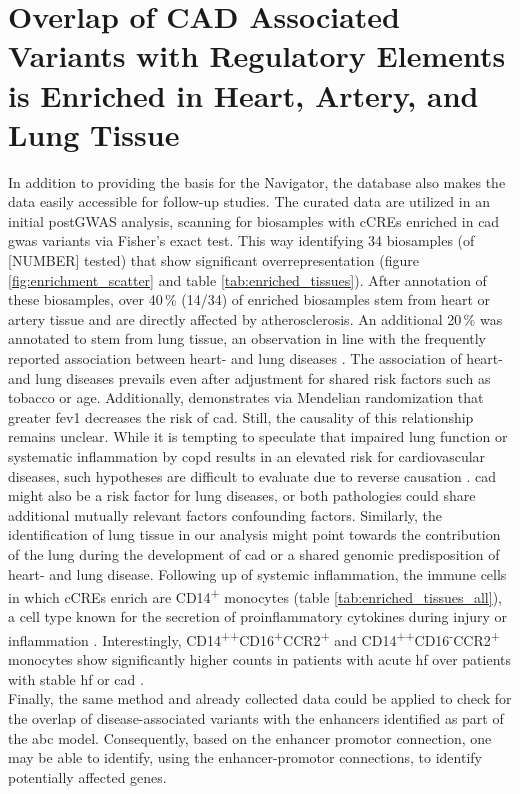 \section{Overlap of CAD Associated Variants with Regulatory Elements is Enriched in Heart, Artery, and Lung Tissue}
In addition to providing the basis for the  Navigator, the database also makes the data easily accessible for follow-up studies. The curated data are utilized in an initial postGWAS analysis, scanning for biosamples with \acp{cCRE} enriched in \ac{cad} \ac{gwas} variants via Fisher's exact test. This way identifying 34 biosamples (of [NUMBER] tested) that show significant overrepresentation (figure \ref{fig:enrichment_scatter} and table \ref{tab:enriched_tissues}). After annotation of these biosamples, over 40\,\% (14/34) of enriched biosamples stem from heart or artery tissue and are directly affected by atherosclerosis. An additional 20\,\% was annotated to stem from lung tissue, an observation in line with the frequently reported association between heart- and lung diseases \cite{carterAssociationCardiovascularDisease2019, hanPulmonaryDiseasesHeart2007}. The association of heart- and lung diseases prevails even after adjustment for shared risk factors such as tobacco or age. Additionally, \textcite{auyeungAssociationGeneticInstrumental2018} demonstrates via Mendelian randomization that greater \ac{fev1} decreases the risk of \ac{cad}. Still, the causality of this relationship remains unclear. While it is tempting to speculate that impaired lung function or systematic inflammation by \ac{copd} results in an elevated risk for cardiovascular diseases, such hypotheses are difficult to evaluate due to reverse causation \cite{nowakLungFunctionCoronary2018}. \ac{cad} might also be a risk factor for lung diseases, or both pathologies could share additional mutually relevant factors confounding factors. Similarly, the identification of lung tissue in our analysis might point towards the contribution of the lung during the development of \ac{cad} or a shared genomic predisposition of heart- and lung disease. Following up of systemic inflammation, the immune cells in which \acp{cCRE} enrich are CD14\textsuperscript{+} monocytes (table \ref{tab:enriched_tissues_all}), a cell type known for the secretion of proinflammatory cytokines during injury or inflammation \cite{kapellosHumanMonocyteSubsets2019}. Interestingly, CD14\textsuperscript{++}CD16\textsuperscript{+}CCR2\textsuperscript{+} and CD14\textsuperscript{++}CD16\textsuperscript{-}CCR2\textsuperscript{+} monocytes show significantly higher counts in patients with acute \ac{hf} over patients with stable \ac{hf} or \ac{cad} \cite{wrigleyCD14CD16Monocytes2013}.\\
Finally, the same method and already collected data could be applied to check for the overlap of disease-associated variants with the enhancers identified as part of the \ac{abc} model. Consequently, based on the enhancer promotor connection, one may be able to identify, using the enhancer-promotor connections, to identify potentially affected genes.
